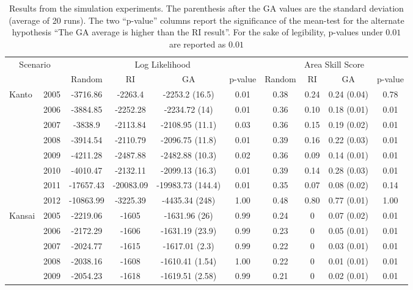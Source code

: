 \documentclass[a4paper,twoside]{article}
\begin{document}
\begin{table}[t!]
  \caption{Results from the simulation experiments. The parenthesis
    after the GA values are the standard deviation (average of 20
    runs). The two ``p-value'' columns report the significance of the
    mean-test for the alternate hypothesis ``The GA average is higher
    than the RI result''. For the sake of legibility, p-values under
    $0.01$ are reported as $0.01$}
  \label{bigtable}
  \begin{center}
  \begin{tabular}{|ll||c|c|c|c||c|c|c|c|}
    \hline
    \multicolumn{2}{|c|}{Scenario} & \multicolumn{4}{|c|}{Log Likelihood} & \multicolumn{4}{|c|}{Area Skill Score}\\
     & & Random & RI & GA & p-value & Random & RI & GA & p-value\\
    \hline
    Kanto & 2005 &-3716.86 & -2263.4&-2253.2 (16.5) & 0.01 & 0.38 & 0.24 & 0.24 (0.04) & 0.78\\
    & 2006 &-3884.85 & -2252.28     &-2234.72 (14) & 0.01 & 0.36 & 0.10 & 0.18 (0.01) & 0.01 \\
    & 2007 &-3838.9 & -2113.84      &-2108.95 (11.1) & 0.03 & 0.36 & 0.15 & 0.19 (0.02) &  0.01 \\
    & 2008 & -3914.54&-2110.79      &-2096.75 (11.8) & 0.01 & 0.39 & 0.16 & 0.22 (0.03) & 0.01 \\
    & 2009 &-4211.28 &-2487.88      &-2482.88 (10.3) & 0.02 & 0.36 & 0.09 & 0.14 (0.01) & 0.01 \\
    & 2010 & -4010.47&-2132.11      &-2099.13 (16.3) & 0.01 & 0.39 & 0.14 & 0.28 (0.03) & 0.01 \\
    & 2011 &-17657.43 &-20083.09    &-19983.73 (144.4) & 0.01 & 0.35 & 0.07 & 0.08 (0.02) & 0.14\\
    & 2012 & -10863.99&-3225.39     &-4435.34 (248) & 1.00 & 0.48 & 0.80 & 0.77 (0.01) & 1.00 \\
    \hline
    Kansai & 2005 &-2219.06 &-1605 &-1631.96 (26) & 0.99 & 0.24 & 0 & 0.07 (0.02) & 0.01 \\
    & 2006 & -2172.29&-1606 &-1631.19 (23.9) & 0.99 & 0.23 & 0 & 0.05 (0.01) & 0.01 \\
    & 2007 &-2024.77 &-1615 &-1617.01 (2.3) & 0.99 & 0.22 & 0 & 0.03 (0.01) & 0.01 \\
    & 2008 &-2038.16 &-1608 &-1610.41 (1.54) & 1.00 & 0.22 & 0 & 0.01 (0.01) & 0.01 \\
    & 2009 &-2054.23 &-1618 &-1619.51 (2.58) & 0.99 & 0.21 & 0 & 0.02 (0.01) & 0.01 \\

\end{tabular}
\end{center}
\end{table}
\end{document}
